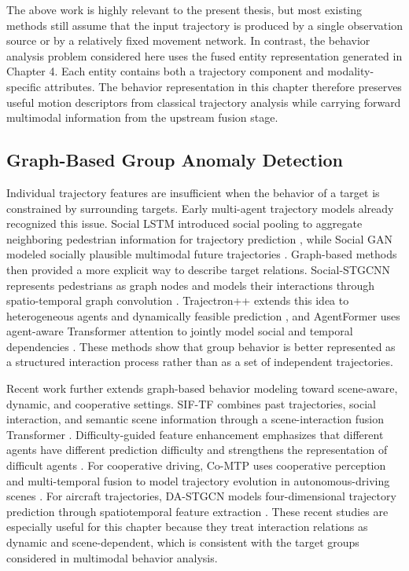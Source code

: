 The above work is highly relevant to the present thesis, but most existing methods still assume that the input trajectory is produced by a single observation source or by a relatively fixed movement network. In contrast, the behavior analysis problem considered here uses the fused entity representation generated in Chapter 4. Each entity contains both a trajectory component and modality-specific attributes. The behavior representation in this chapter therefore preserves useful motion descriptors from classical trajectory analysis while carrying forward multimodal information from the upstream fusion stage.

\subsection{Graph-Based Group Anomaly Detection}
Individual trajectory features are insufficient when the behavior of a target is constrained by surrounding targets. Early multi-agent trajectory models already recognized this issue. Social LSTM introduced social pooling to aggregate neighboring pedestrian information for trajectory prediction \cite{alahi2016sociallstm}, while Social GAN modeled socially plausible multimodal future trajectories \cite{gupta2018socialgan}. Graph-based methods then provided a more explicit way to describe target relations. Social-STGCNN represents pedestrians as graph nodes and models their interactions through spatio-temporal graph convolution \cite{mohamed2020socialstgcnn}. Trajectron++ extends this idea to heterogeneous agents and dynamically feasible prediction \cite{salzmann2020trajectronpp}, and AgentFormer uses agent-aware Transformer attention to jointly model social and temporal dependencies \cite{yuan2021agentformer}. These methods show that group behavior is better represented as a structured interaction process rather than as a set of independent trajectories.

Recent work further extends graph-based behavior modeling toward scene-aware, dynamic, and cooperative settings. SIF-TF combines past trajectories, social interaction, and semantic scene information through a scene-interaction fusion Transformer \cite{gao2024siftf}. Difficulty-guided feature enhancement emphasizes that different agents have different prediction difficulty and strengthens the representation of difficult agents \cite{xin2024dgfnet}. For cooperative driving, Co-MTP uses cooperative perception and multi-temporal fusion to model trajectory evolution in autonomous-driving scenes \cite{zhang2025comtp}. For aircraft trajectories, DA-STGCN models four-dimensional trajectory prediction through spatiotemporal feature extraction \cite{kuang2025dastgcn}. These recent studies are especially useful for this chapter because they treat interaction relations as dynamic and scene-dependent, which is consistent with the target groups considered in multimodal behavior analysis.


